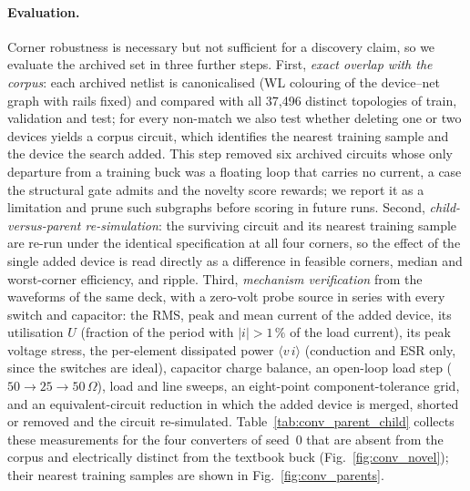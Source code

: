 \paragraph{Evaluation.}
Corner robustness is necessary but not sufficient for a discovery claim, so
we evaluate the archived set in three further steps. First, \emph{exact
overlap with the corpus}: each archived netlist is canonicalised (WL
colouring of the device--net graph with rails fixed) and compared with all
37{,}496 distinct topologies of train, validation and test; for every
non-match we also test whether deleting one or two devices yields a corpus
circuit, which identifies the nearest training sample and the device the
search added. This step removed six archived circuits whose only departure
from a training buck was a floating loop that carries no current, a case the
structural gate admits and the novelty score rewards; we report it as a
limitation and prune such subgraphs before scoring in future runs. Second,
\emph{child-versus-parent re-simulation}: the surviving circuit and its
nearest training sample are re-run under the identical specification at all
four corners, so the effect of the single added device is read directly as a
difference in feasible corners, median and worst-corner efficiency, and
ripple. Third, \emph{mechanism verification} from the waveforms of the same
deck, with a zero-volt probe source in series with every switch and
capacitor: the RMS, peak and mean current of the added device, its
utilisation $U$ (fraction of the period with $|i|>1\,\%$ of the load
current), its peak voltage stress, the per-element dissipated power
$\langle v\,i\rangle$ (conduction and ESR only, since the switches are ideal),
capacitor charge balance, an open-loop load step ($50\to25\to50\,\Omega$),
load and line sweeps, an eight-point component-tolerance grid, and an
equivalent-circuit reduction in which the added device is merged, shorted
or removed and the circuit re-simulated. Table~\ref{tab:conv_parent_child}
collects these measurements for the four converters of seed~0 that are
absent from the corpus and electrically distinct from the textbook buck
(Fig.~\ref{fig:conv_novel}); their nearest training samples are shown in
Fig.~\ref{fig:conv_parents}.


